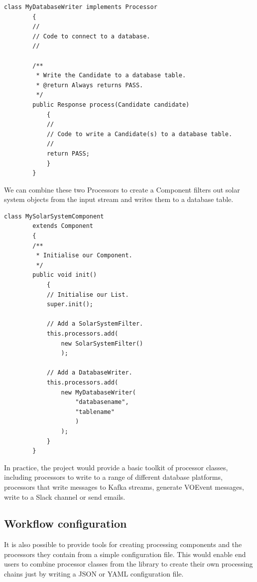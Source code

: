 \documentclass{article}
\newcommand{\json} {JSON\xspace}
\newcommand{\yaml} {YAML\xspace}
\newcommand{\voevent} {VOEvent\xspace}
\newcommand{\kafka} {Kafka\xspace}
\newcommand{\javaname}[1] {{\ttfamily\color{codeblue} #1}}
\begin{document}
\begin{lstlisting}[style=Java]
    class MyDatabaseWriter implements Processor
        {
        //
        // Code to connect to a database.
        //

        /**
         * Write the Candidate to a database table.
         * @return Always returns PASS.
         */
        public Response process(Candidate candidate)
            {
            //
            // Code to write a Candidate(s) to a database table.
            //
            return PASS;
            }
        }
\end{lstlisting}

We can combine these two \javaname{Processors} to create a \javaname{Component} filters out solar system objects from the input stream and writes them to a database table.

\begin{lstlisting}[style=Java]
    class MySolarSystemComponent
        extends Component
        {
        /**
         * Initialise our Component.
         */
        public void init()
            {
            // Initialise our List.
            super.init();

            // Add a SolarSystemFilter.
            this.processors.add(
                new SolarSystemFilter()
                );

            // Add a DatabaseWriter.
            this.processors.add(
                new MyDatabaseWriter(
                    "databasename",
                    "tablename"
                    )
                );
            }
        }
\end{lstlisting}

In practice, the project would provide a basic toolkit of processor classes, including processors to write to a range of different database platforms, processors that write messages to \kafka streams, generate \voevent messages, write to a Slack channel or send emails.

\subsection{Workflow configuration}
\label{workflow-configuration}

It is also possible to provide tools for creating processing components and the processors they contain from a simple configuration file. This would enable end users to combine processor classes from the library to create their own processing chains just by writing a \json or \yaml configuration file.
\end{document}
